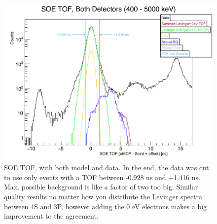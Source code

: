 \begin{figure}[h!tb]
	\centering
	\includegraphics[width=.999\linewidth]
	{Figures/SOE_TOF_Spectra.pdf}
	\caption[SOE TOF -- Model and Data]{SOE TOF, with both model and data.  In the end, the data was cut to use only events with a TOF between -0.928 ns and +1.416 ns.  Max. possible background is like a factor of two too big.  Similar quality results no matter how you distribute the Levinger spectra between 4S and 3P, however adding the 0 eV electrons makes a big improvement to the agreement. }	
	\label{fig:soetof}
\end{figure}


